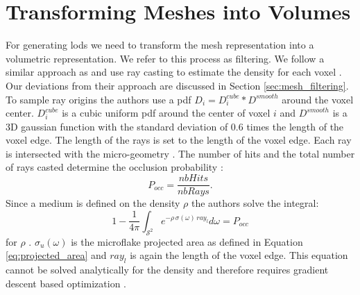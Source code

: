 \section{Transforming Meshes into Volumes}
\label{sec:transforming_meshes_into_volumes}
For generating \acp{lod} we need to transform the mesh representation into a volumetric representation.
We refer to this process as filtering.
We follow a similar approach as \citeauthor{hybrid_mesh_volume_lods} and use ray casting to estimate the density for each voxel \cite{hybrid_mesh_volume_lods}.
Our deviations from their approach are discussed in Section \ref{sec:mesh_filtering}.
To sample ray origins the authors use a \ac{pdf} $D_i=D_i^{cube} \ast D^{smooth}$ around the voxel center.
$D_i^{cube}$ is a cubic uniform \ac{pdf} around the center of voxel $i$ and $D^{smooth}$ is a 3D gaussian function with the standard deviation of 0.6 times the length of the voxel edge.
The length of the rays is set to the length of the voxel edge.
Each ray is intersected with the micro-geometry \cite{hybrid_mesh_volume_lods}.
The number of hits and the total number of rays casted determine the occlusion probability \cite{hybrid_mesh_volume_lods}:
\begin{equation*}
    P_{occ}=\frac{nbHits}{nbRays}.
\end{equation*}
Since a medium is defined on the density $\rho$ the authors solve the integral:
\begin{equation}
    1 - \frac{1}{4\pi}\int_{\mathcal{S}^2} e^{-\rho \, \sigma(\omega) \, ray_l} d\omega = P_{occ}
    \label{eq:loubet_filtering_equation}
\end{equation}
for $\rho$ \cite{hybrid_mesh_volume_lods}.
$\sigma_u(\omega)$ is the microflake projected area as defined in Equation \ref{eq:projected_area} and $ray_l$ is again the length of the voxel edge.
This equation cannot be solved analytically for the density and therefore requires gradient descent based optimization \cite{hybrid_mesh_volume_lods}.





